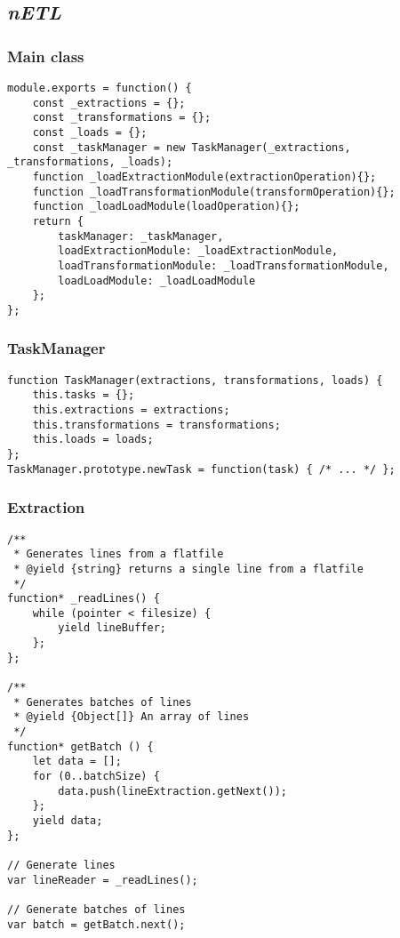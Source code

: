 \subsection{\textit{nETL}}
\label{appendix:netl}

\subsubsection{Main class}
\label{appendix:netl-main}
\begin{verbatim}
module.exports = function() {
    const _extractions = {};
    const _transformations = {};
    const _loads = {};        
    const _taskManager = new TaskManager(_extractions, _transformations, _loads);
    function _loadExtractionModule(extractionOperation){};
    function _loadTransformationModule(transformOperation){};
    function _loadLoadModule(loadOperation){};
    return {
        taskManager: _taskManager,
        loadExtractionModule: _loadExtractionModule,
        loadTransformationModule: _loadTransformationModule,
        loadLoadModule: _loadLoadModule
    };
};
\end{verbatim}

\subsubsection{TaskManager}
\label{appendix:netl-taskmanager}
\begin{verbatim}
function TaskManager(extractions, transformations, loads) {
    this.tasks = {};
    this.extractions = extractions;
    this.transformations = transformations;
    this.loads = loads;
};
TaskManager.prototype.newTask = function(task) { /* ... */ };
\end{verbatim}

\subsubsection{Extraction}
\label{appendix:netl-extraction}
\begin{verbatim}
/**
 * Generates lines from a flatfile
 * @yield {string} returns a single line from a flatfile
 */
function* _readLines() {
    while (pointer < filesize) {
        yield lineBuffer;
    };
};

/**
 * Generates batches of lines
 * @yield {Object[]} An array of lines
 */
function* getBatch () {
    let data = [];
    for (0..batchSize) {
        data.push(lineExtraction.getNext());
    };
    yield data;
};

// Generate lines
var lineReader = _readLines();

// Generate batches of lines
var batch = getBatch.next();
\end{verbatim}


